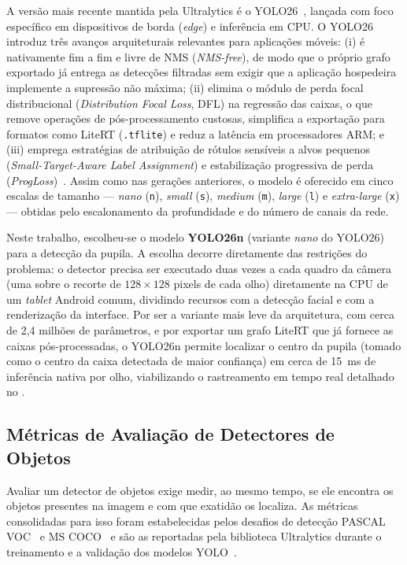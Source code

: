 A versão mais recente mantida pela Ultralytics é o YOLO26~\cite{yolo26}, lançada com foco específico em dispositivos de borda (\textit{edge}) e inferência em CPU. O YOLO26 introduz três avanços arquiteturais relevantes para aplicações móveis: (i) é nativamente fim a fim e livre de NMS (\textit{NMS-free}), de modo que o próprio grafo exportado já entrega as detecções filtradas sem exigir que a aplicação hospedeira implemente a supressão não máxima; (ii) elimina o módulo de perda focal distribucional (\textit{Distribution Focal Loss}, DFL) na regressão das caixas, o que remove operações de pós-processamento custosas, simplifica a exportação para formatos como LiteRT (\texttt{.tflite}) e reduz a latência em processadores ARM; e (iii) emprega estratégias de atribuição de rótulos sensíveis a alvos pequenos (\textit{Small-Target-Aware Label Assignment}) e estabilização progressiva de perda (\textit{ProgLoss})~\cite{yolo26}. Assim como nas gerações anteriores, o modelo é oferecido em cinco escalas de tamanho --- \textit{nano} (\texttt{n}), \textit{small} (\texttt{s}), \textit{medium} (\texttt{m}), \textit{large} (\texttt{l}) e \textit{extra-large} (\texttt{x}) --- obtidas pelo escalonamento da profundidade e do número de canais da rede.

Neste trabalho, escolheu-se o modelo \textbf{YOLO26n} (variante \textit{nano} do YOLO26)~\cite{yolo26} para a detecção da pupila. A escolha decorre diretamente das restrições do problema: o detector precisa ser executado duas vezes a cada quadro da câmera (uma sobre o recorte de $128 \times 128$ pixels de cada olho) diretamente na CPU de um \textit{tablet} Android comum, dividindo recursos com a detecção facial e com a renderização da interface. Por ser a variante mais leve da arquitetura, com cerca de 2,4 milhões de parâmetros, e por exportar um grafo LiteRT que já fornece as caixas pós-processadas, o YOLO26n permite localizar o centro da pupila (tomado como o centro da caixa detectada de maior confiança) em cerca de 15~ms de inferência nativa por olho, viabilizando o rastreamento em tempo real detalhado no .

\subsection{Métricas de Avaliação de Detectores de Objetos} \label{sec:metricas_visao}

Avaliar um detector de objetos exige medir, ao mesmo tempo, se ele encontra os objetos presentes na imagem e com que exatidão os localiza. As métricas consolidadas para isso foram estabelecidas pelos desafios de detecção PASCAL VOC~\cite{everingham2010pascal} e MS COCO~\cite{lin2014microsoft} e são as reportadas pela biblioteca Ultralytics durante o treinamento e a validação dos modelos YOLO~\cite{ultralytics_metrics}.

